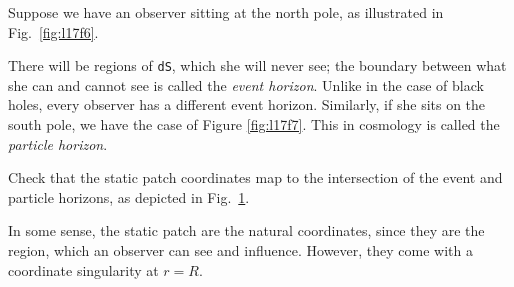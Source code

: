 Suppose we have an observer sitting at the north pole, as illustrated in Fig.~\ref{fig:l17f6}.
\begin{figure}[tbhp]
  \centering
  \begin{minipage}[t]{0.33\columnwidth}
    \centering
    \def\svgwidth{0.9\columnwidth}
    
    \caption{}
    \label{fig:l17f6}
  \end{minipage}%
  \begin{minipage}[t]{0.33\columnwidth}
    \centering
    \def\svgwidth{0.9\columnwidth}
    
    \caption{}
    \label{fig:l17f7}
  \end{minipage}%
  \begin{minipage}[t]{0.33\columnwidth}
    \centering
    \def\svgwidth{0.9\columnwidth}
    
    \caption{}
    \label{fig:l17f8}
  \end{minipage}%
\end{figure}
There will be regions of \texttt{dS}, which she will never see; the boundary between what she can and cannot see is called the \emph{event horizon}. Unlike in the case of black holes, every observer has a different event horizon.
Similarly, if she sits on the south pole, we have the case of Figure \ref{fig:l17f7}.
This in cosmology is called the \emph{particle horizon}.
\begin{exercise}
  Check that the static patch coordinates map to the intersection of the event and particle horizons, as depicted in Fig.~\ref{fig:l17f8}.
\end{exercise}
In some sense, the static patch are the natural coordinates, since they are the region, which an observer can see and influence.
However, they come with a coordinate singularity at $r  = R$.
